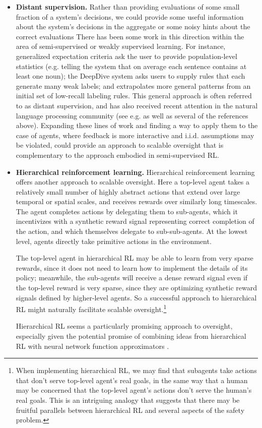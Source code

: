 \documentclass[a4paper,10pt]{article}
\begin{document}
\begin{itemize}
\item \textbf{Distant supervision.}  Rather than providing evaluations of some small fraction of a system’s decisions, we could provide some useful information about the system’s decisions in the aggregate or some noisy hints about the correct evaluations  There has been some work in this direction within the area of semi-supervised or weakly supervised learning.  For instance, generalized expectation criteria \cite{mann2010generalized,druck2008learning} ask the user to provide population-level statistics (e.g. telling the system that on average each sentence contains at least one noun); the DeepDive system \cite{shin2015incremental} asks users to supply rules that each generate many weak labels; and \cite{gupta2015distantly} extrapolates more general patterns from an initial set of low-recall labeling rules.  This general approach is often referred to as distant supervision, and has also received recent attention in the natural language processing community (see e.g. \cite{go2009twitter,mintz2009distant} as well as several of the references above).  Expanding these lines of work and finding a way to apply them to the case of agents, where feedback is more interactive and i.i.d. assumptions may be violated, could provide an approach to scalable oversight that is complementary to the approach embodied in semi-supervised RL.

\item \textbf{Hierarchical reinforcement learning.} Hierarchical reinforcement learning \cite{dayan1993feudal} offers another approach to scalable oversight.  Here a top-level agent takes a relatively small number of highly abstract actions that extend over large temporal or spatial scales, and receives rewards over similarly long timescales.  The agent completes actions by delegating them to sub-agents, which it incentivizes with a synthetic reward signal representing correct completion of the action, and which themselves delegate to sub-sub-agents.  At the lowest level, agents directly take primitive actions in the environment.

The top-level agent in hierarchical RL may be able to learn from very sparse rewards, since it does not need to learn how to implement the details of its policy; meanwhile, the sub-agents will receive a dense reward signal even if the top-level reward is very sparse, since they are optimizing synthetic reward signals defined by higher-level agents. So a successful approach to hierarchical RL might naturally facilitate scalable oversight.\footnote{When implementing hierarchical RL, we may find that subagents take actions that don’t serve top-level agent’s real goals, in the same way that a human may be concerned that the top-level agent’s actions don’t serve the human’s real goals. This is an intriguing analogy that suggests that there may be fruitful parallels between hierarchical RL and several aspects of the safety problem.}

Hierarchical RL seems a particularly promising approach to oversight, especially given the potential promise of combining ideas from hierarchical RL with neural network function approximators \cite{kulkarni2016hierarchical}.
\end{itemize}
\end{document}
